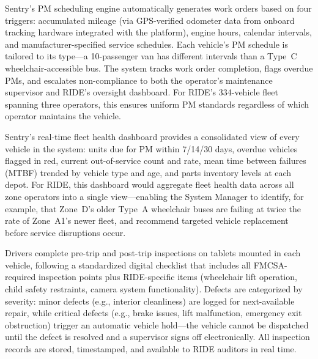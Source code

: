 \begin{description}[style=nextline, leftmargin=0.5cm]
    \item[\faIcon{tools} \textbf{PM Scheduling Engine:}] Sentry's PM scheduling engine automatically generates work orders based on four triggers: accumulated mileage (via GPS-verified odometer data from onboard tracking hardware integrated with the platform), engine hours, calendar intervals, and manufacturer-specified service schedules. Each vehicle's PM schedule is tailored to its type---a 10-passenger van has different intervals than a Type~C wheelchair-accessible bus. The system tracks work order completion, flags overdue PMs, and escalates non-compliance to both the operator's maintenance supervisor and RIDE's oversight dashboard. For RIDE's 334-vehicle fleet spanning three operators, this ensures uniform PM standards regardless of which operator maintains the vehicle.

    \item[\faIcon{chart-bar} \textbf{Fleet Health Dashboard:}] Sentry's real-time fleet health dashboard provides a consolidated view of every vehicle in the system: units due for PM within 7/14/30 days, overdue vehicles flagged in red, current out-of-service count and rate, mean time between failures (MTBF) trended by vehicle type and age, and parts inventory levels at each depot. For RIDE, this dashboard would aggregate fleet health data across all zone operators into a single view---enabling the System Manager to identify, for example, that Zone~D's older Type~A wheelchair buses are failing at twice the rate of Zone~A1's newer fleet, and recommend targeted vehicle replacement before service disruptions occur.

    \item[\faIcon{clipboard-check} \textbf{Pre- \& Post-Trip Inspection Digitization:}] Drivers complete pre-trip and post-trip inspections on tablets mounted in each vehicle, following a standardized digital checklist that includes all FMCSA-required inspection points plus RIDE-specific items (wheelchair lift operation, child safety restraints, camera system functionality). Defects are categorized by severity: minor defects (e.g., interior cleanliness) are logged for next-available repair, while critical defects (e.g., brake issues, lift malfunction, emergency exit obstruction) trigger an automatic vehicle hold---the vehicle cannot be dispatched until the defect is resolved and a supervisor signs off electronically. All inspection records are stored, timestamped, and available to RIDE auditors in real time.


\end{description}
